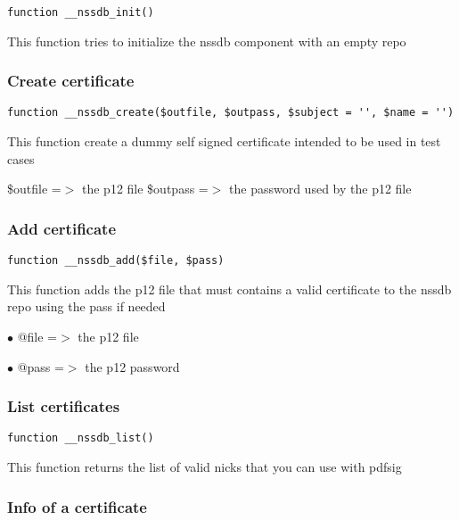 \documentclass[a4paper]{article}
\begin{document}
\begin{lstlisting}
function __nssdb_init()
\end{lstlisting}

This function tries to initialize the nssdb component with an empty repo

\hypertarget{toc12}{}
\subsubsection{Create certificate}

\begin{lstlisting}
function __nssdb_create($outfile, $outpass, $subject = '', $name = '')
\end{lstlisting}

This function create a dummy self signed certificate intended to be used in
test cases

\$outfile =$>$ the p12 file
\$outpass =$>$ the password used by the p12 file

\hypertarget{toc13}{}
\subsubsection{Add certificate}

\begin{lstlisting}
function __nssdb_add($file, $pass)
\end{lstlisting}

This function adds the p12 file that must contains a valid certificate to the
nssdb repo using the pass if needed

\begin{compactitem}
\item[\color{myblue}$\bullet$] @file =$>$ the p12 file
\item[\color{myblue}$\bullet$] @pass =$>$ the p12 password
\end{compactitem}

\hypertarget{toc14}{}
\subsubsection{List certificates}

\begin{lstlisting}
function __nssdb_list()
\end{lstlisting}

This function returns the list of valid nicks that you can use with pdfsig

\hypertarget{toc15}{}
\subsubsection{Info of a certificate}
\end{document}
